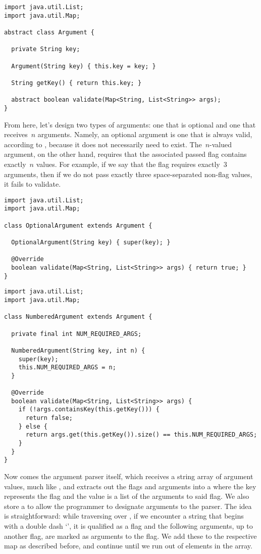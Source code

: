 \begin{lstlisting}[language=MyJava]
import java.util.List;
import java.util.Map;

abstract class Argument {

  private String key;

  Argument(String key) { this.key = key; }

  String getKey() { return this.key; }

  abstract boolean validate(Map<String, List<String>> args);
}
\end{lstlisting}

From here, let's design two types of arguments: one that is optional and one that receives~$n$ arguments. Namely, an optional argument is one that is always valid, according to , because it does not necessarily need to exist. The~$n$-valued argument, on the other hand, requires that the associated passed flag contains exactly~$n$ values. For example, if we say that the  flag requires exactly~$3$ arguments, then if we do not pass exactly three space-separated non-flag values, it fails to validate.


\begin{lstlisting}[language=MyJava]
import java.util.List;
import java.util.Map;

class OptionalArgument extends Argument {

  OptionalArgument(String key) { super(key); }

  @Override
  boolean validate(Map<String, List<String>> args) { return true; }
}
\end{lstlisting}

\begin{lstlisting}[language=MyJava]
import java.util.List;
import java.util.Map;

class NumberedArgument extends Argument {

  private final int NUM_REQUIRED_ARGS;

  NumberedArgument(String key, int n) {
    super(key);
    this.NUM_REQUIRED_ARGS = n;
  }

  @Override
  boolean validate(Map<String, List<String>> args) {
    if (!args.containsKey(this.getKey())) { 
      return false; 
    } else { 
      return args.get(this.getKey()).size() == this.NUM_REQUIRED_ARGS; 
    }
  }
}
\end{lstlisting}

Now comes the argument parser itself, which receives a string array of argument values, much like , and extracts out the flags and arguments into a  where the key represents the flag and the value is a list of the arguments to said flag. We also store a  to allow the programmer to designate arguments to the parser. The idea is straightforward: while traversing over , if we encounter a string that begins with a double dash `\ttt{--}', it is qualified as a flag and the following arguments, up to another flag, are marked as arguments to the flag. We add these to the respective map as described before, and continue until we run out of elements in the array.

